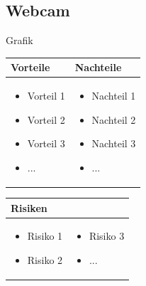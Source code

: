 \pagebreak

\subsection{Webcam}
Grafik

\begin{table}[h]
\begin{tabular}{p{} | p{}}


 \textbf{Vorteile} & \textbf{Nachteile} \\ \hline
	 
\begin{itemize}
\item Vorteil 1
\item Vorteil 2
\item Vorteil 3
\item ...
\end{itemize}

 
 &
 
\begin{itemize}
\item Nachteil 1
\item Nachteil 2
\item Nachteil 3
\item ...
\end{itemize}

\end{tabular}
\end{table}

\begin{table}[h]
\begin{tabular}{p{}p{}}


 \textbf{Risiken} & \\ \hline
	 
\begin{itemize}
\item Risiko 1
\item Risiko 2
\end{itemize}
&
\begin{itemize}
\item Risiko 3
\item ...
\end{itemize}

 
\end{tabular}
\end{table}

\pagebreak